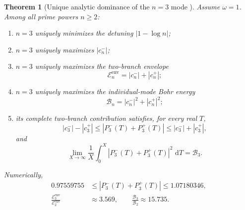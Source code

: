 \documentclass[11pt]{amsart}
\numberwithin{equation}{section}
\theoremstyle{plain}
\newtheorem{theorem}{Theorem}[section]
\theoremstyle{definition}
\theoremstyle{remark}
\newcommand{\1}{\mathbf{1}}
\newcommand{\dd}{\,\mathrm{d}}
\begin{document}
\begin{theorem}[Unique analytic dominance of the \(n=3\) mode {\normalfont[New theorem, unconditional for $\omega=1$]}]
\label{thm:n3_analytic_dominance}
Assume $\omega=1$.  Among all prime powers $n\geq2$:
\begin{enumerate}[label=\textup{(\roman*)}]
\item $n=3$ uniquely minimizes the detuning $|1-\log n|$;
\item $n=3$ uniquely maximizes $|c_n^-|$;
\item $n=3$ uniquely maximizes the two-branch envelope
\begin{equation}
\mathscr E_n^{\mathrm{env}}=|c_n^-|+|c_n^+|;
\label{eq:n3_total_envelope}
\end{equation}
\item $n=3$ uniquely maximizes the individual-mode Bohr energy
\begin{equation}
\mathcal B_n=|c_n^-|^2+|c_n^+|^2;
\label{eq:n3_mode_bohr_energy_definition}
\end{equation}
\item its complete two-branch contribution satisfies, for every real $T$,
\begin{equation}
|c_3^-|-|c_3^+|
\leq
|P_3^-(T)+P_3^+(T)|
\leq
|c_3^-|+|c_3^+|,
\label{eq:n3_pointwise_annulus}
\end{equation}
and
\begin{equation}
\lim_{X\to\infty}\frac1X\int_0^X
|P_3^-(T)+P_3^+(T)|^2\,\dd T
=
\mathcal B_3.
\label{eq:n3_bohr_energy}
\end{equation}
\end{enumerate}
Numerically,
\begin{align}
0.97559755
&\leq
|P_3^-(T)+P_3^+(T)|
\leq
1.07180346,
\label{eq:n3_numerical_envelope}
\\
\frac{\mathscr E_3^{\mathrm{env}}}{\mathscr E_2^{\mathrm{env}}}
&\approx3.569,
\qquad
\frac{\mathcal B_3}{\mathcal B_2}
\approx15.735.
\label{eq:n3_ratios_to_n2}
\end{align}
\end{theorem}
\end{document}
